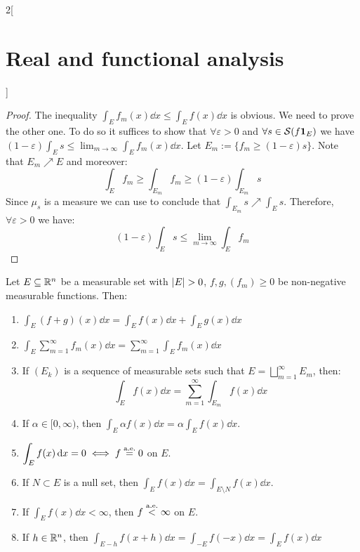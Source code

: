 \documentclass[../../../main_math.tex]{subfiles}
\begin{document}
\begin{multicols}{2}[\section{Real and functional analysis}]
\begin{important}
  \end{important}
  \begin{proof}
    The inequality $\int_Ef_m(x)\dd{x}\leq \int_Ef(x)\dd{x}$ is obvious. We need to prove the other one. To do so it suffices to show that $\forall \varepsilon>0$ and $\forall s\in\mathcal{S}(f\boldsymbol{\mathrm{1}}_{E})$ we have $(1-\varepsilon)\int_E s\leq {\displaystyle\lim_{m\to\infty}}\int_Ef_m(x)\dd{x}$.
    Let $E_m:=\{f_m\geq (1-\varepsilon)s\}$. Note that $E_m\nearrow E$ and moreover:
    $$\int_Ef_m\geq\int_{E_m}f_m\geq(1-\varepsilon)\int_{E_m}s$$
    Since $\mu_s$ is a measure we can use  to conclude that $\int_{E_m}s\nearrow \int_{E}s$. Therefore, $\forall\varepsilon>0$ we have: $$(1-\varepsilon)\int_{E}s\leq \lim_{m\to\infty}\int_Ef_m$$
  \end{proof}
  \begin{proposition}
    Let $E\subseteq\mathbb{R}^n$ be a measurable set with $\m{E}>0$, $f, g, (f_m)\geq 0$ be non-negative measurable functions. Then:
    \begin{enumerate}
      \item\label{RFA:postmonotoneA} $\displaystyle\int_E (f+g)(x)\dd{x}=\int_Ef(x)\dd{x}+\int_Eg(x)\dd{x}$
      \item\label{RFA:postmonotoneB} $\displaystyle\int_E\sum_{m=1}^\infty f_m(x)\dd{x}=\sum_{m=1}^\infty\int_E f_m(x)\dd{x}$
      \item\label{RFA:postmonotoneC} If $(E_k)$ is a sequence of measurable sets such that $E=\bigsqcup_{m=1}^\infty E_m$, then: $$\int_Ef(x)\dd{x}=\sum_{m=1}^\infty\int_{E_m}f(x)\dd{x}$$
      \item\label{RFA:postmonotoneD} If $\alpha\in[0,\infty)$, then $\displaystyle\int_E\alpha f(x)\dd{x}=\alpha\int_Ef(x)\dd{x}$.
      \item\label{RFA:postmonotoneE} $\displaystyle\int_Ef(x)\dd{x}=0\iff f\overset{\text{a.e.}}{=}0$ on $E$.
      \item\label{RFA:postmonotoneF} If $N\subset E$ is a null set, then $\displaystyle\int_Ef(x)\dd{x}=\int_{E\setminus N}f(x)\dd{x}$.
      \item\label{RFA:postmonotoneG} If $\displaystyle\int_Ef(x)\dd{x}<\infty$, then $f\overset{\text{a.e.}}{<}\infty$ on $E$.
      \item\label{RFA:postmonotoneH} If $h\in\mathbb{R}^n$, then $\displaystyle\int_{E-h}f(x+h)\dd{x}=\int_{-E}f(-x)\dd{x}=\int_{E}f(x)\dd{x}$
    \end{enumerate}
  \end{proposition}
  \begin{sproof}

\end{sproof}
\end{multicols}
\end{document}
